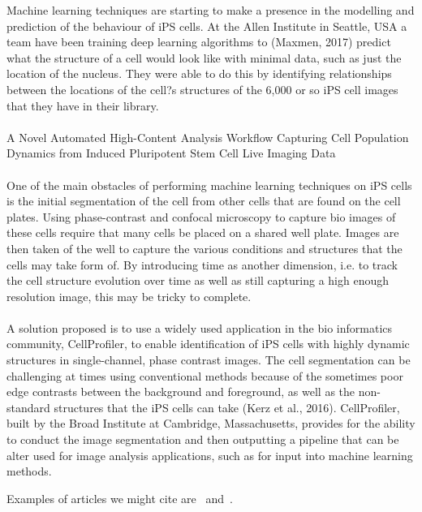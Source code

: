 {Machine learning techniques are starting to make a presence in the modelling and prediction of the behaviour of iPS cells. At the Allen Institute in Seattle, USA a team have been training deep learning algorithms to (Maxmen, 2017) predict what the structure of a cell would look like with minimal data, such as just the location of the nucleus. They were able to do this by identifying relationships between the locations of the cell?s structures of the 6,000 or so iPS cell images that they have in their library. \\ \\ 
A Novel Automated High-Content Analysis Workflow Capturing Cell Population Dynamics from Induced Pluripotent Stem Cell Live Imaging Data \\ \\
One of the main obstacles of performing machine learning techniques on iPS cells is the initial segmentation of the cell from other cells that are found on the cell plates. Using phase-contrast and confocal microscopy to capture bio images of these cells require that many cells be placed on a shared well plate. Images are then taken of the well to capture the various conditions and structures that the cells may take form of. By introducing time as another dimension, i.e. to track the cell structure evolution over time as well as still capturing a high enough resolution image, this may be tricky to complete. \\ \\ 
 A solution proposed is to use a widely used application in the bio informatics community, CellProfiler, to enable identification of iPS cells with highly dynamic structures in single-channel, phase contrast images. The cell segmentation can be challenging at times using conventional methods because of the sometimes poor edge contrasts between the background and foreground, as well as the non-standard structures that the iPS cells can take (Kerz et al., 2016). CellProfiler, built by the Broad Institute at Cambridge, Massachusetts, provides for the ability to conduct the image segmentation and then outputting a pipeline that can be alter used for image analysis applications, such as for input into machine learning methods.
}

Examples of articles we might cite are~\cite{Doe11} and~\cite{JohSil05}.
